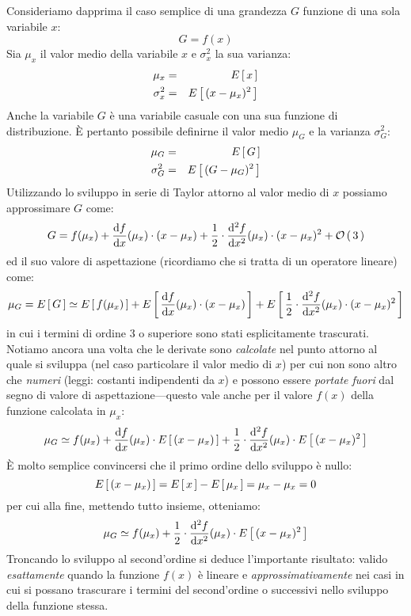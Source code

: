 Consideriamo dapprima il caso semplice di una grandezza $G$ funzione di una
sola variabile $x$:
$$
G = f(x)
$$
Sia $\mu_x$ il valor medio della variabile $x$ e $\sigma^2_x$ la sua varianza:
\begin{eqnarray*}
\mu_x      & = & \displaystyle E\left[\, x \, \right] \\
\sigma^2_x & = & \displaystyle E\left[\, (x-\mu_x)^2 \, \right]
\end{eqnarray*}
Anche la variabile $G$ \`e una variabile casuale con una sua
funzione di distribuzione. \`E pertanto possibile definirne il valor medio
$\mu_G$ e la varianza $\sigma^2_G$:
\begin{eqnarray*}
\mu_G      & = & \displaystyle E\left[\, G \, \right] \\
\sigma^2_G & = & \displaystyle E\left[\, (G-\mu_G)^2 \, \right]
\end{eqnarray*}
Utilizzando lo sviluppo in serie di Taylor attorno al valor medio di $x$
possiamo approssimare $G$ come:
$$
G = f(\mu_x) +
\displaystyle \frac{\mathrm{d} f}{\mathrm{d} x}({\mu_x}) \cdot (x - \mu_x) +
\frac{1}{2} \cdot \displaystyle \frac{\mathrm{d}^2f}{\mathrm{d} x^2}({\mu_x}) \cdot (x-\mu_x)^2 +
{\cal O} \left( \, 3 \, \right)
$$
ed il suo valore di aspettazione (ricordiamo che si tratta di un
operatore lineare) come:
$$
\mu_G = \displaystyle E\left[\, G \, \right] \simeq
\displaystyle E\left[\, f(\mu_x) \, \right] +
\displaystyle E\left[\, \displaystyle \frac{\mathrm{d} f}{\mathrm{d} x}({\mu_x}) \cdot (x - \mu_x) \, \right] +
\displaystyle E\left[\, \frac{1}{2} \cdot \displaystyle \frac{\mathrm{d}^2f}{\mathrm{d} x^2}({\mu_x}) \cdot (x-\mu_x)^2 \, \right]
$$
in cui i termini di ordine $3$ o superiore sono stati esplicitamente
trascurati.
Notiamo ancora una volta che le derivate sono \emph{calcolate}
nel punto attorno al quale si sviluppa (nel caso particolare il valor
medio di $x$) per cui non sono altro che \emph{numeri} (leggi: costanti
indipendenti da $x$) e possono essere \emph{portate fuori} dal segno di
valore di aspettazione---questo vale anche per il valore $f(x)$ della
funzione calcolata in $\mu_x$:
$$
\mu_G \simeq f(\mu_x) +
\displaystyle \frac{\mathrm{d} f}{\mathrm{d} x}({\mu_x}) \cdot \displaystyle E\left[\, (x - \mu_x) \, \right] +
\frac{1}{2} \cdot \displaystyle \frac{\mathrm{d}^2f}{\mathrm{d} x^2}({\mu_x}) \cdot \displaystyle E\left[\, (x-\mu_x)^2 \, \right]
$$
\`E molto semplice convincersi che il primo ordine dello sviluppo
\`e nullo:
$$
\displaystyle E\left[\, (x - \mu_x) \, \right] = \displaystyle E\left[\, x \, \right] - \displaystyle E\left[\, \mu_x \, \right] = \mu_x - \mu_x = 0
$$
per cui alla fine, mettendo tutto insieme, otteniamo:
$$
\mu_G \simeq
f(\mu_x) +
\frac{1}{2} \cdot \displaystyle \frac{\mathrm{d}^2f}{\mathrm{d} x^2}({\mu_x}) \cdot \displaystyle E\left[\, (x - \mu_x)^2 \, \right]
$$
Troncando lo sviluppo al second'ordine si deduce l'importante risultato:
valido \emph{esattamente} quando la funzione $f(x)$ \`e lineare e
\emph{approssimativamente} nei casi in cui si possano trascurare i termini
del second'ordine o successivi nello sviluppo della funzione stessa.

